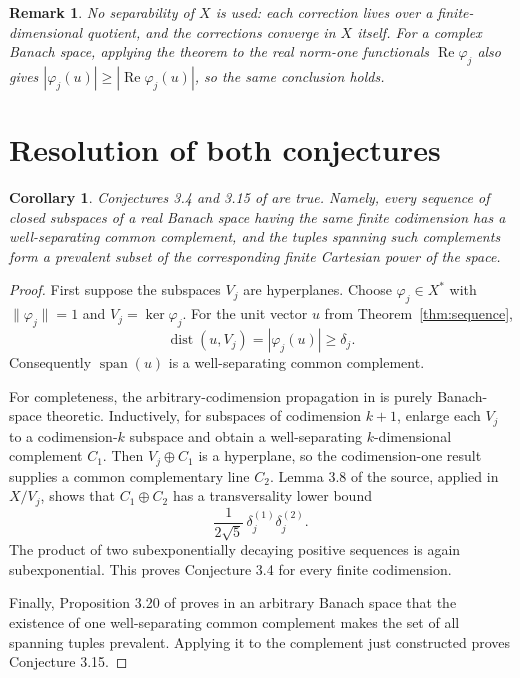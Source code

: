 \documentclass[11pt]{article}
\newtheorem{corollary}[theorem]{Corollary}
\newtheorem{remark}[theorem]{Remark}
\newcommand{\dist}{\operatorname{dist}}
\begin{document}
\begin{remark}
No separability of $X$ is used: each correction lives over a
finite-dimensional quotient, and the corrections converge in $X$ itself.
For a complex Banach space, applying the theorem to the real norm-one
functionals $\operatorname{Re}\varphi_j$ also gives
$|\varphi_j(u)|\geq|\operatorname{Re}\varphi_j(u)|$, so the same conclusion
holds.
\end{remark}

\section{Resolution of both conjectures}

\begin{corollary}\label{cor:conjectures}
Conjectures 3.4 and 3.15 of \cite{Noethen} are true.  Namely, every sequence
of closed subspaces of a real Banach space having the same finite codimension
has a well-separating common complement, and the tuples spanning such
complements form a prevalent subset of the corresponding finite Cartesian
power of the space.
\end{corollary}

\begin{proof}
First suppose the subspaces $V_j$ are hyperplanes.  Choose
$\varphi_j\in X^*$ with $\|\varphi_j\|=1$ and
$V_j=\ker\varphi_j$.  For the unit vector $u$ from
Theorem~\ref{thm:sequence},
\[
 \dist(u,V_j)=|\varphi_j(u)|\geq\delta_j.
\]
Consequently $\operatorname{span}(u)$ is a well-separating common
complement.

For completeness, the arbitrary-codimension propagation in \cite{Noethen}
is purely Banach-space theoretic.  Inductively, for subspaces of codimension
$k+1$, enlarge each $V_j$ to a codimension-$k$ subspace and obtain a
well-separating $k$-dimensional complement $C_1$.  Then
$V_j\oplus C_1$ is a hyperplane, so the codimension-one result supplies a
common complementary line $C_2$.  Lemma 3.8 of the source, applied in
$X/V_j$, shows that $C_1\oplus C_2$ has a transversality lower bound
\[
 \frac{1}{2\sqrt5}\,\delta_j^{(1)}\delta_j^{(2)}.
\]
The product of two subexponentially decaying positive sequences is again
subexponential.  This proves Conjecture 3.4 for every finite codimension.

Finally, Proposition 3.20 of \cite{Noethen} proves in an arbitrary Banach
space that the existence of one well-separating common complement makes the
set of all spanning tuples prevalent.  Applying it to the complement just
constructed proves Conjecture 3.15.
\end{proof}
\end{document}
